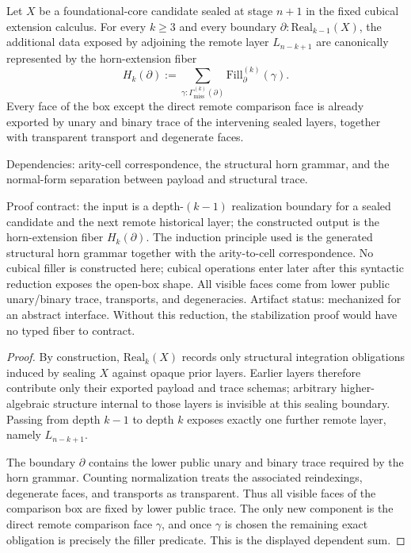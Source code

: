 \documentclass{lmcs}
\begin{document}
\begin{lem}
\label{lem:syntactic-horn-reduction}
Let \(X\) be a foundational-core candidate sealed at stage \(n+1\) in the fixed cubical
extension calculus.  For every \(k\geq 3\) and every boundary
\(\partial:\mathrm{Real}_{k-1}(X)\), the additional data exposed by adjoining the remote layer
\(L_{n-k+1}\) are canonically represented by the horn-extension fiber
\[
  H_k(\partial)
  :=
  \sum_{\gamma:\Gamma_{\mathrm{miss}}^{(k)}(\partial)}
  \mathrm{Fill}^{(k)}_{\partial}(\gamma).
\]
Every face of the box except the direct remote comparison face is already exported by unary
and binary trace of the intervening sealed layers, together with transparent transport and
degenerate faces.

Dependencies: arity-cell correspondence, the structural horn grammar, and the normal-form
separation between payload and structural trace.

Proof contract: the input is a depth-\((k-1)\) realization boundary for a
sealed candidate and the next remote historical layer; the constructed output
is the horn-extension fiber \(H_k(\partial)\).  The induction principle used is
the generated structural horn grammar together with the arity-to-cell
correspondence.  No cubical filler is constructed here; cubical operations enter
later after this syntactic reduction exposes the open-box shape.  All visible
faces come from lower public unary/binary trace, transports, and degeneracies.
Artifact status: mechanized for an abstract interface.  Without this reduction,
the stabilization proof would have no typed fiber to contract.
\end{lem}

\begin{proof}
By construction, \(\mathrm{Real}_k(X)\) records only structural integration obligations induced
by sealing \(X\) against opaque prior layers.  Earlier layers therefore contribute only their
exported payload and trace schemas; arbitrary higher-algebraic structure internal to those
layers is invisible at this sealing boundary.  Passing from depth \(k-1\) to depth \(k\)
exposes exactly one further remote layer, namely \(L_{n-k+1}\).

The boundary \(\partial\) contains the lower public unary and binary trace required by the
horn grammar.  Counting normalization treats the associated reindexings, degenerate faces,
and transports as transparent.  Thus all visible faces of the comparison box are fixed by
lower public trace.  The only new component is the direct remote comparison face \(\gamma\),
and once \(\gamma\) is chosen the remaining exact
obligation is precisely the filler predicate.  This is the displayed dependent sum.
\end{proof}
\end{document}
